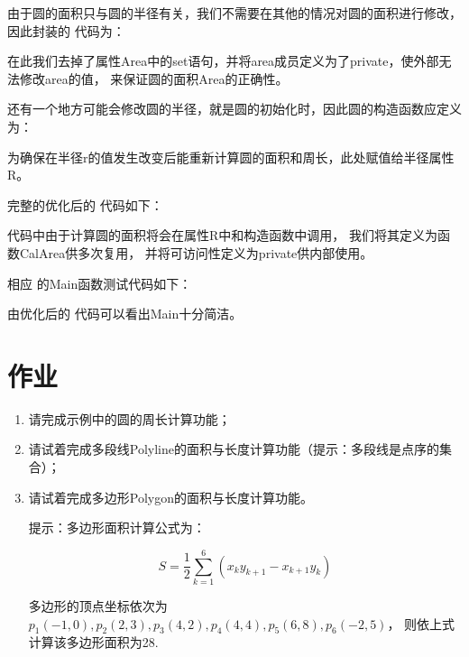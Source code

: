 由于圆的面积只与圆的半径有关，我们不需要在其他的情况对圆的面积进行修改，
因此封装的 \cs 代码为：



在此我们去掉了属性Area中的set语句，并将area成员定义为了private，使外部无法修改area的值，
来保证圆的面积Area的正确性。

还有一个地方可能会修改圆的半径，就是圆的初始化时，因此圆的构造函数应定义为：



为确保在半径r的值发生改变后能重新计算圆的面积和周长，此处赋值给半径属性R。

完整的优化后的 \cs 代码如下：


代码中由于计算圆的面积将会在属性R中和构造函数中调用，
我们将其定义为函数CalArea供多次复用，
并将可访问性定义为private供内部使用。

相应 \cs 的Main函数测试代码如下：



由优化后的 \cs 代码可以看出Main十分简洁。

\section{作业}
\begin{enumerate}
\item 请完成示例中的圆的周长计算功能；
\item 请试着完成多段线Polyline的面积与长度计算功能（提示：多段线是点序的集合）；
\item 请试着完成多边形Polygon的面积与长度计算功能。

提示：多边形面积计算公式为：

$$S=\frac{1}{2}\sum_{k=1}^{6}{(x_k y_{k+1} - x_{k+1} y_k)}$$

多边形的顶点坐标依次为
$p_1(-1,0), p_2(2,3), p_3(4,2), p_4(4,4),p_5(6,8),p_6(-2,5)$，
则依上式计算该多边形面积为28.
\end{enumerate}
